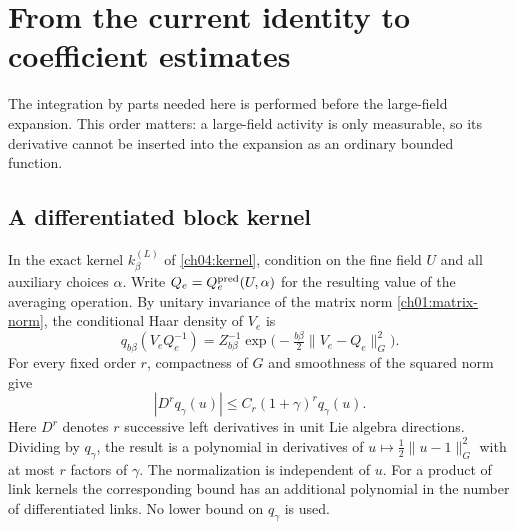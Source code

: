 \section{From the current identity to coefficient estimates}
\label{ch17:marked-rates}

The integration by parts needed here is performed before the
large-field expansion. This order matters: a large-field activity is
only measurable, so its derivative cannot be inserted into the
expansion as an ordinary bounded function.

\subsection{A differentiated block kernel}

In the exact kernel $k^{(L)}_\beta$ of \eqref{ch04:kernel}, condition
on the fine field $U$ and all auxiliary choices $\alpha$. Write
$Q_e=Q_e^{\rm pred}(U,\alpha)$ for the resulting value of the averaging operation. By
unitary invariance of the matrix norm \eqref{ch01:matrix-norm}, the
conditional Haar density of $V_e$ is
\[
 q_{b\beta}(V_eQ_e^{-1})
    =Z_{b\beta}^{-1}\exp\bigl(-\tfrac{b\beta}{2}\|V_e-Q_e\|_G^2\bigr).
\]
For every fixed order $r$, compactness of $G$ and smoothness of the
squared norm give
\begin{equation}\label{ch17:kernel-score}
 |D^r q_\gamma(u)|\le C_r(1+\gamma)^r q_\gamma(u).
\end{equation}
Here $D^r$ denotes $r$ successive left derivatives in unit Lie algebra
directions. Dividing by $q_\gamma$, the result is a polynomial in
derivatives of $u\mapsto\tfrac12\|u-1\|_G^2$ with at most $r$ factors
of $\gamma$. The normalization is
independent of $u$. For a product of link kernels the corresponding
bound has an additional polynomial in the number of differentiated
links. No lower bound on $q_\gamma$ is used.

